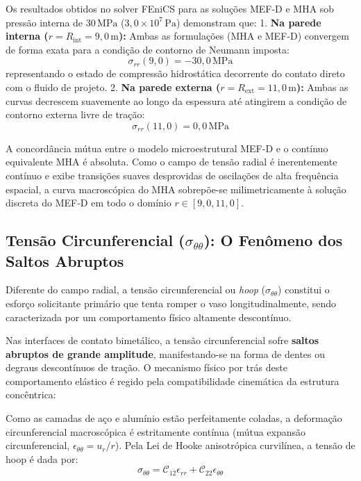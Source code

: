 Os resultados obtidos no solver FEniCS para as soluções MEF-D e MHA sob pressão interna de $30 \, \text{MPa}$ ($3,0 \times 10^7 \, \text{Pa}$) demonstram que:
1. \textbf{Na parede interna ($r = R_{\text{int}} = 9,0 \, \text{m}$):} Ambas as formulações (MHA e MEF-D) convergem de forma exata para a condição de contorno de Neumann imposta:
\begin{equation}
  \sigma_{rr}(9,0) = -30,0 \, \text{MPa}
  \label{eq:srr_int_val}
\end{equation}
representando o estado de compressão hidrostática decorrente do contato direto com o fluido de projeto.
2. \textbf{Na parede externa ($r = R_{\text{ext}} = 11,0 \, \text{m}$):} Ambas as curvas decrescem suavemente ao longo da espessura até atingirem a condição de contorno externa livre de tração:
\begin{equation}
  \sigma_{rr}(11,0) = 0,0 \, \text{MPa}
  \label{eq:srr_ext_val}
\end{equation}

A concordância mútua entre o modelo microestrutural MEF-D e o contínuo equivalente MHA é absoluta. Como o campo de tensão radial é inerentemente contínuo e exibe transições suaves desprovidas de oscilações de alta frequência espacial, a curva macroscópica do MHA sobrepõe-se milimetricamente à solução discreta do MEF-D em todo o domínio $r \in [9,0, 11,0]$.

\subsection{Tensão Circunferencial ($\sigma_{\theta\theta}$): O Fenômeno dos Saltos Abruptos}

Diferente do campo radial, a tensão circunferencial ou \textit{hoop} ($\sigma_{\theta\theta}$) constitui o esforço solicitante primário que tenta romper o vaso longitudinalmente, sendo caracterizada por um comportamento físico altamente descontínuo.

Nas interfaces de contato bimetálico, a tensão circunferencial sofre \textbf{saltos abruptos de grande amplitude}, manifestando-se na forma de dentes ou degraus descontínuos de tração. O mecanismo físico por trás deste comportamento elástico é regido pela compatibilidade cinemática da estrutura concêntrica:

Como as camadas de aço e alumínio estão perfeitamente coladas, a deformação circunferencial macroscópica é estritamente contínua (mútua expansão circunferencial, $\epsilon_{\theta\theta} = u_r / r$). Pela Lei de Hooke anisotrópica curvilínea, a tensão de hoop é dada por:
\begin{equation}
  \sigma_{\theta\theta} = \mathcal{C}_{12} \epsilon_{rr} + \mathcal{C}_{22} \epsilon_{\theta\theta}
  \label{eq:hooke_stheta}
\end{equation}

